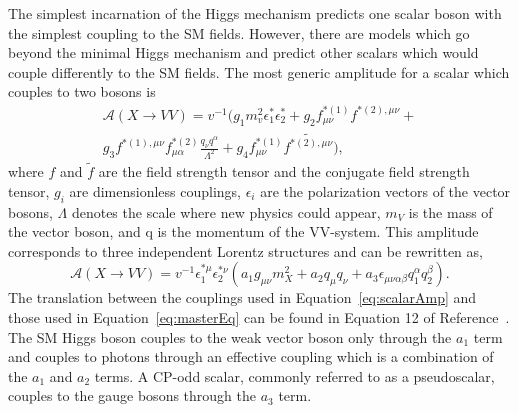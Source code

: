 The simplest incarnation of the Higgs mechanism predicts one scalar 
boson with the simplest coupling to the SM fields.  However, there 
are models which go beyond the minimal Higgs mechanism and predict 
other scalars which would couple differently to the SM fields.  
The most generic amplitude for a scalar which couples to two 
bosons is
\begin{equation}
\begin{split}
  \mathscr{A}(X\to VV) = v^{-1}(g_1m_v^2\epsilon_1^*\epsilon_2^*+g_2f_{\mu\nu}^{*(1)}f^{*(2),\mu\nu}+ \\
g_3f^{*(1),\mu\nu}f_{\mu\alpha}^{*(2)}\frac{q_\nu q^\alpha}{\Lambda^2}+g_4f_{\mu\nu}^{*(1)}\tilde{f^{*(2),\mu\nu}}),
\label{eq:scalarAmp}
\end{split}
\end{equation}
where $f$ and $\tilde{f}$ are the field strength tensor and the 
conjugate field strength tensor, $g_i$ are dimensionless couplings,
$\epsilon_i$ are the polarization vectors of the vector bosons, 
$\Lambda$ denotes the scale where new physics could appear, $m_V$ 
is the mass of the vector boson, and q is the momentum of the 
VV-system.  This amplitude corresponds to three independent
Lorentz structures and can be rewritten as,
\begin{equation}
\mathscr{A}(X\to VV) = v^{-1}\epsilon_1^{*\mu}\epsilon_2^{*\nu}(a_1g_{\mu\nu}m_X^2+a_2q_\mu q_\nu+a_3\epsilon_{\mu\nu\alpha\beta}q_1^{\alpha}q_2^{\beta}). 
\label{eq:masterEq}
\end{equation}
The translation between the couplings used in Equation~\ref{eq:scalarAmp} and those used in Equation~\ref{eq:masterEq} can be found in Equation 12 of Reference~\cite{Bolognesi:2012mm}.  The SM Higgs boson couples to the weak vector boson only through the $a_1$ term and
couples to photons through an effective coupling which is a 
combination of the $a_1$ and $a_2$ terms.  A CP-odd scalar, 
commonly referred to as a pseudoscalar, couples to the gauge 
bosons through the $a_3$ term.

